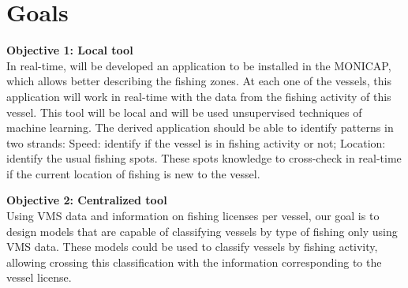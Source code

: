 


\section{Goals} %
\label{sec:objectives}

\textbf{Objective 1: Local tool} \\
In real-time, will be developed an application to be installed in the MONICAP, which allows better describing the fishing zones. At each one of the vessels, this application will work in real-time with the data from the fishing activity of this vessel. This tool will be local and will be used unsupervised techniques of machine learning.
The derived application should be able to identify patterns in two strands:
Speed: identify if the vessel is in fishing activity or not;
Location: identify the usual fishing spots. These spots knowledge to cross-check in real-time if the current location of fishing is new to the vessel.

\textbf{Objective 2: Centralized tool} \\
Using VMS data and information on fishing licenses per vessel, our goal is to design models that are capable of classifying vessels by type of fishing only using VMS data. These models could be used to classify vessels by fishing activity, allowing crossing this classification with the information corresponding to the vessel license.


